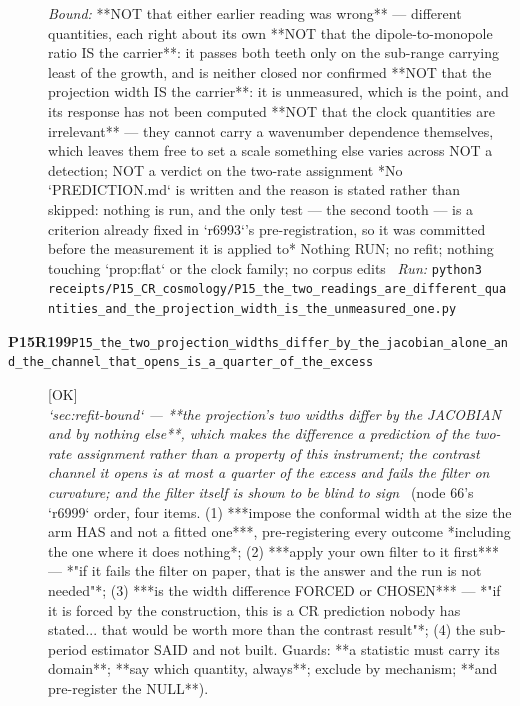 \begin{description}
 \emph{Bound:}  **NOT that either earlier reading was wrong** --- different quantities, each right about its own  **NOT that the dipole-to-monopole ratio IS the carrier**: it passes both teeth only on the sub-range carrying least of the growth, and is neither closed nor confirmed  **NOT that the projection width IS the carrier**: it is unmeasured, which is the point, and its response has not been computed  **NOT that the clock quantities are irrelevant** --- they cannot carry a wavenumber dependence themselves, which leaves them free to set a scale something else varies across  NOT a detection; NOT a verdict on the two-rate assignment  *No `PREDICTION.md` is written and the reason is stated rather than skipped: nothing is run, and the only test --- the second tooth --- is a criterion already fixed in `r6993`'s pre-registration, so it was committed before the measurement it is applied to*  Nothing RUN; no refit; nothing touching `prop:flat` or the clock family; no corpus edits
\ \emph{Run:} \texttt{python3 receipts/P15\_CR\_cosmology/P15\_the\_two\_readings\_are\_different\_quantities\_and\_the\_projection\_width\_is\_the\_unmeasured\_one.py}
\item[\rcptlabel{P15_the_two_projection_widths_differ_by_the_jacobian_alone_and_the_channel_that_opens_is_a_quarter_of_the_excess}{P15R199}\textbf{P15R199}\quad\texttt{P15\_the\_two\_projection\_widths\_differ\_by\_the\_jacobian\_alone\_and\_the\_channel\_that\_opens\_is\_a\_quarter\_of\_the\_excess}]\hfill\textsf{[OK]}\\
\textit{`sec:refit-bound` --- **the projection's two widths differ by the JACOBIAN and by nothing else**, which makes the difference a prediction of the two-rate assignment rather than a property of this instrument; the contrast channel it opens is at most a quarter of the excess and fails the filter on curvature; and the filter itself is shown to be blind to sign} \ (node 66's `r6999` order, four items. (1) ***impose the conformal width at the size the arm HAS and not a fitted one***, pre-registering every outcome  *including the one where it does nothing*; (2) ***apply your own filter to it first*** --- *"if it fails the filter on paper, that is the answer and the run is not needed"*; (3) ***is the width difference FORCED or CHOSEN*** ---  *"if it is forced by the construction, this is a CR prediction nobody has stated... that would be worth more than the contrast result"*; (4) the sub-period estimator SAID and not built.  Guards: **a statistic must carry its domain**; **say which quantity, always**; exclude by mechanism; **and pre-register the NULL**). 

\end{description}
